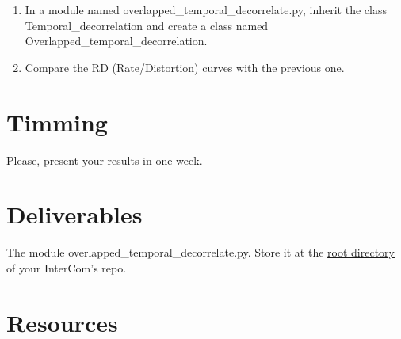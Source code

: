 \begin{enumerate}
\item In a module named overlapped\_temporal\_decorrelate.py, inherit
  the class Temporal\_decorrelation and create a class named
  Overlapped\_temporal\_decorrelation.
\item Compare the RD (Rate/Distortion) curves with the previous one.
\end{enumerate}

\section{Timming}

Please, present your results in one week.

\section{Deliverables}

The module overlapped\_temporal\_decorrelate.py. Store it at the
\href{https://github.com/Tecnologias-multimedia/intercom}{root
  directory} of your InterCom's repo.

\section{Resources}


